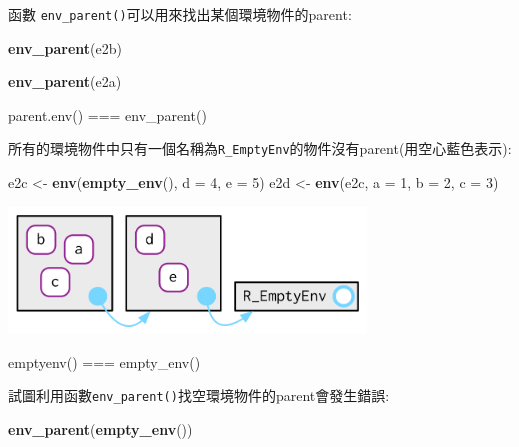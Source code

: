\documentclass[]{book}
\newenvironment{Shaded}{\begin{snugshade}}{\end{snugshade}}
\newcommand{\DataTypeTok}[1]{\textcolor[rgb]{0.13,0.29,0.53}{#1}}
\newcommand{\DecValTok}[1]{\textcolor[rgb]{0.00,0.00,0.81}{#1}}
\newcommand{\KeywordTok}[1]{\textcolor[rgb]{0.13,0.29,0.53}{\textbf{#1}}}
\newcommand{\NormalTok}[1]{#1}
\newcommand{\StringTok}[1]{\textcolor[rgb]{0.31,0.60,0.02}{#1}}
\theoremstyle{definition}
\theoremstyle{definition}
\theoremstyle{definition}
\theoremstyle{remark}
\begin{document}
函數 \texttt{env\_parent()}可以用來找出某個環境物件的parent:

\begin{Shaded}
\begin{Highlighting}[]
\KeywordTok{env_parent}\NormalTok{(e2b)}
\end{Highlighting}
\end{Shaded}

\begin{Shaded}
\begin{Highlighting}[]
\KeywordTok{env_parent}\NormalTok{(e2a)}
\end{Highlighting}
\end{Shaded}

parent.env() === env\_parent()

所有的環境物件中只有一個名稱為\texttt{R\_EmptyEnv}的物件沒有parent(用空心藍色表示):

\begin{Shaded}
\begin{Highlighting}[]
\NormalTok{e2c <-}\StringTok{ }\KeywordTok{env}\NormalTok{(}\KeywordTok{empty_env}\NormalTok{(), }\DataTypeTok{d =} \DecValTok{4}\NormalTok{, }\DataTypeTok{e =} \DecValTok{5}\NormalTok{)}
\NormalTok{e2d <-}\StringTok{ }\KeywordTok{env}\NormalTok{(e2c, }\DataTypeTok{a =} \DecValTok{1}\NormalTok{, }\DataTypeTok{b =} \DecValTok{2}\NormalTok{, }\DataTypeTok{c =} \DecValTok{3}\NormalTok{)}
\end{Highlighting}
\end{Shaded}

\begin{center}\includegraphics[width=3.74in]{diagrams/environments/parents-empty} \end{center}

emptyenv() === empty\_env()

試圖利用函數\texttt{env\_parent()}找空環境物件的parent會發生錯誤:

\begin{Shaded}
\begin{Highlighting}[]
\KeywordTok{env_parent}\NormalTok{(}\KeywordTok{empty_env}\NormalTok{())}
\end{Highlighting}
\end{Shaded}
\end{document}
